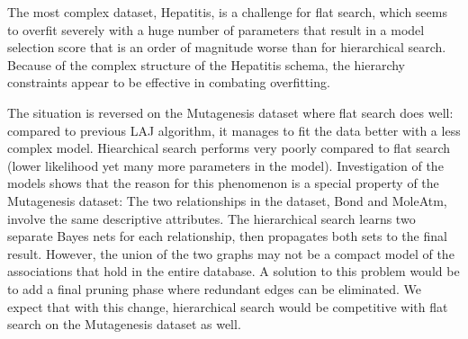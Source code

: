\documentclass{article}
\begin{document}
The most complex dataset, Hepatitis, is a challenge for flat search, which seems to overfit severely with a huge number of parameters that result in a model selection score that is an order of magnitude worse than for hierarchical search. Because of the complex structure of the Hepatitis schema, the hierarchy constraints appear to be effective in combating overfitting.

%
%
%


 The situation is reversed on the Mutagenesis dataset where flat search does well: compared to previous LAJ algorithm, %
it manages to fit the data better with a less complex model. 
Hiearchical search performs very poorly compared to flat search (lower likelihood yet many more parameters in the model). Investigation of the models shows that the reason for this phenomenon is a special property of the Mutagenesis dataset: The two relationships in the dataset, Bond and MoleAtm, involve the same descriptive attributes. The hierarchical search learns two separate Bayes nets for each relationship, then propagates both sets to the final result. However, the union of the two graphs may not be a compact model of the associations that hold in the entire database. A solution to this problem would be to add a final pruning phase where redundant edges can be eliminated. We expect that with this change, hierarchical search would be competitive with flat search on the Mutagenesis dataset as well.
%
\end{document}
